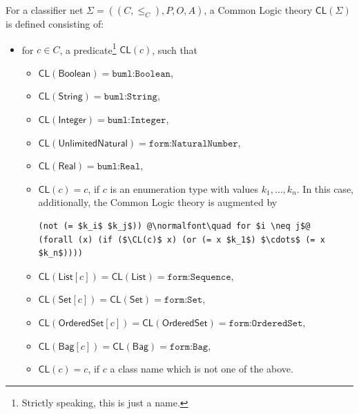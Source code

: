 \documentclass[10pt, a4paper]{isov2}
\newcommand*{\CL}{\ensuremath{\mathsf{CL}}\xspace}
\begin{document}
For a classifier net $\Sigma = ((C, {\leq_C}), P, O, A)$,
a Common Logic theory $\CL(\Sigma)$ is defined consisting of:
%
\begin{itemize}[topsep=0pt, label=--, leftmargin=*]
  \item for $c \in C$,
a predicate\footnote{Strictly speaking, this is just a name.} $\CL(c)$,
such that
\begin{itemize}[topsep=0pt, label=--, leftmargin=*]
  \item $\CL(\mathsf{Boolean}) = \texttt{buml:Boolean}$,

  \item $\CL(\mathsf{String}) = \texttt{buml:String}$,

  \item $\CL(\mathsf{Integer}) = \texttt{buml:Integer}$,

  \item $\CL(\mathsf{UnlimitedNatural}) = \texttt{form:NaturalNumber}$,

  \item $\CL(\mathsf{Real}) = \texttt{buml:Real}$,

  \item $\CL(c) = c$,
if $c$
is an enumeration type with values $k_1, \ldots, k_n$.
In this case, additionally, the Common Logic theory is augmented by
%
\begin{lstlisting}[language=clif, mathescape, escapechar=@]
(not (= $k_i$ $k_j$)) @\normalfont\quad for $i \neq j$@
(forall (x) (if ($\CL(c)$ x) (or (= x $k_1$) $\cdots$ (= x $k_n$))))
\end{lstlisting}

  \item $\CL(\mathsf{List}[c]) = \CL(\mathsf{List}) = \texttt{form:Sequence}$,

  \item $\CL(\mathsf{Set}[c]) = \CL(\mathsf{Set}) = \texttt{form:Set}$,

  \item $\CL(\mathsf{OrderedSet}[c]) = \CL(\mathsf{OrderedSet}) = \texttt{form:OrderedSet}$,

  \item $\CL(\mathsf{Bag}[c]) = \CL(\mathsf{Bag}) = \texttt{form:Bag}$,

  \item $\CL(c) = c$, if $c$ a class name which is not one of the above.
\end{itemize}


\end{itemize}
\end{document}
